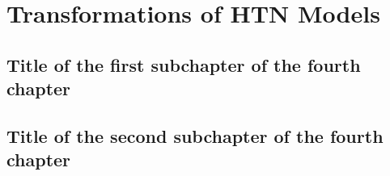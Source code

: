 \chapter{Transformations of {HTN} {M}odels}

\section{Title of the first subchapter of the fourth chapter}

\section{Title of the second subchapter of the fourth chapter}